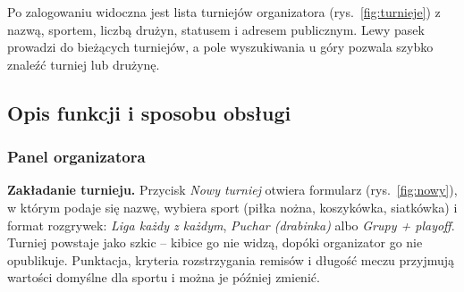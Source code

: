 \documentclass[11pt,a4paper,oneside]{article}
\newif\ifpodpowiedzi
\newcommand{\podpowiedz}[1]{\ifpodpowiedzi\par\begingroup\small\color{hintcolor}\textit{Wskazówka: #1}\par\endgroup\fi}
\begin{document}

Po zalogowaniu widoczna jest lista turniejów organizatora (rys.~\ref{fig:turnieje}) z nazwą, sportem, liczbą drużyn, statusem i adresem publicznym. Lewy pasek prowadzi do bieżących turniejów, a pole wyszukiwania u góry pozwala szybko znaleźć turniej lub drużynę.


\subsection{Opis funkcji i sposobu obsługi}
\podpowiedz{Opisz dostępne funkcje oraz sposób ich użycia, grupując je według zadań użytkownika. Wyjaśnij istotne elementy interfejsu, polecenia i ustawienia. Dla animacji może to być sposób odtwarzania i korzystania z przekazanych formatów; dla prototypu - sterowanie; dla biblioteki - publiczny interfejs i przykłady wywołań.}
\pagebreak[3]
\subsubsection*{Panel organizatora}

\textbf{Zakładanie turnieju.} Przycisk \emph{Nowy turniej} otwiera formularz (rys.~\ref{fig:nowy}), w którym podaje się nazwę, wybiera sport (piłka nożna, koszykówka, siatkówka) i format rozgrywek: \emph{Liga każdy z każdym}, \emph{Puchar (drabinka)} albo \emph{Grupy + playoff}. Turniej powstaje jako szkic -- kibice go nie widzą, dopóki organizator go nie opublikuje. Punktacja, kryteria rozstrzygania remisów i długość meczu przyjmują wartości domyślne dla sportu i można je później zmienić.

\end{document}

